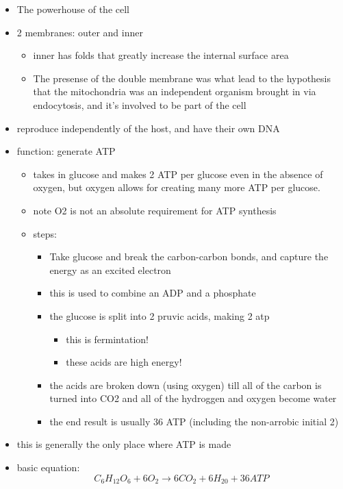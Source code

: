 \documentclass{article}
\theoremstyle{definition}
\begin{document}
\begin{itemize}
		\begin{itemize}
			\item  The powerhouse of the cell
			\item 2 membranes: outer and inner
				\begin{itemize}
					\item inner has folds that greatly increase the internal surface area
					\item The presense of the double membrane was what lead to the hypothesis that the mitochondria was an independent organism brought in via endocytosis, and it's involved to be part of the cell
				\end{itemize}
			\item reproduce independently of the host, and have their own DNA
			\item function: generate ATP
				\begin{itemize}
					\item takes in glucose and makes 2 ATP per glucose even in the absence of oxygen, but oxygen allows for creating many more ATP per glucose.
					\item note O2 is not an absolute requirement for ATP synthesis
					\item steps:
						\begin{itemize}
							\item Take glucose and break the carbon-carbon bonds, and capture the energy as an excited electron
							\item this is used to combine an ADP and a phosphate
							\item the glucose is split into 2 pruvic acids, making 2 atp
								\begin{itemize}
									\item this is fermintation!
									\item these acids are high energy!
								\end{itemize}
							\item the acids are broken down (using oxygen) till all of the carbon is turned into CO2 and all of the hydroggen and oxygen become water
							\item the end result is usually 36 ATP (including the non-arrobic initial 2)
						\end{itemize}
				\end{itemize}
			\item this is generally the only place where ATP is made
			\item basic equation:
				\[
				C_6H_{12}O_6 + 6O_2\to 6CO_2 + 6H_{20} + 36 ATP
\]
\end{itemize}
\end{itemize}
\end{document}
